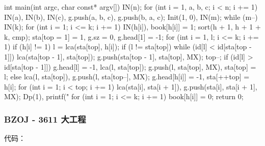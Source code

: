 \begin{cppcode}
int main(int argc, char const* argv[]) {
  IN(n);
  for (int i = 1, a, b, c; i < n; i += 1)
    IN(a), IN(b), IN(c), g.push(a, b, c), g.push(b, a, c);
  Init(1, 0), IN(m);
  while (m--) {
    IN(k);
    for (int i = 1; i <= k; i += 1) IN(h[i]), book[h[i]] = 1;
    sort(h + 1, h + 1 + k, cmp);
    sta[top = 1] = 1, g.sz = 0, g.head[1] = -1;
    for (int i = 1, l; i <= k; i += 1)
      if (h[i] != 1) {
        l = lca(sta[top], h[i]);
        if (l != sta[top]) {
          while (id[l] < id[sta[top - 1]]) {
            lca(sta[top - 1], sta[top]);
            g.push(sta[top - 1], sta[top], MX);
            top--;
          }
          if (id[l] > id[sta[top - 1]]) {
            g.head[l] = -1, lca(l, sta[top]);
            g.push(l, sta[top], MX), sta[top] = l;
          } else
            lca(l, sta[top]), g.push(l, sta[top--], MX);
        }
        g.head[h[i]] = -1, sta[++top] = h[i];
      }
    for (int i = 1; i < top; i += 1)
      lca(sta[i], sta[i + 1]), g.push(sta[i], sta[i + 1], MX);
    Dp(1), printf("%
    for (int i = 1; i <= k; i += 1) book[h[i]] = 0;
  }
  return 0;
}
\end{cppcode}

\subsubsection{BZOJ - 3611 大工程}

代码：

